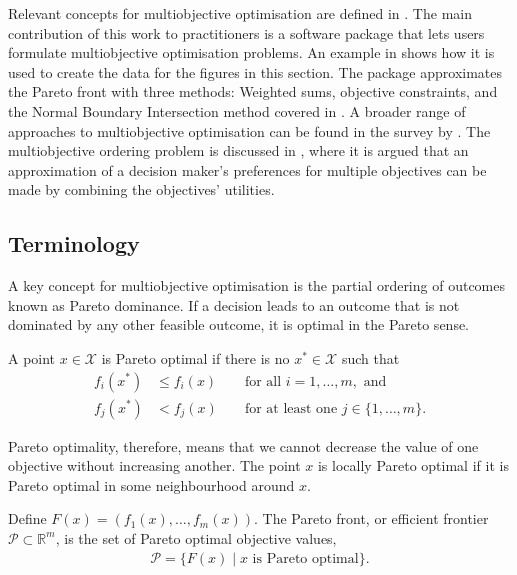 \documentclass[main.tex]{subfiles}
\begin{document}
Relevant concepts for multiobjective optimisation are defined in
.  The main contribution of this work to
practitioners is a software package that lets users formulate
multiobjective optimisation problems.  An example in
 shows how it is used to create the data for
the figures in this section.  The package approximates the Pareto
front with
three methods: Weighted sums, objective
constraints, and the Normal Boundary Intersection method covered in
.  A broader range of
approaches to multiobjective optimisation can be found in the survey
by \citet{marler2004survey}.  The multiobjective ordering problem is
discussed in , where it is argued that an
approximation of a decision maker's preferences for multiple
objectives can be made by combining the objectives' utilities.


\subsection{Terminology}\label{sec:multi_terminology}
A key concept for multiobjective optimisation is the partial
ordering of outcomes known as Pareto dominance. If a decision leads to
an outcome that is not dominated by any other feasible outcome, it is
optimal in the Pareto sense.
\begin{mydef}
  A point $x\in\mathcal{X}$ is Pareto optimal if there is no
  $x^*\in\mathcal{X}$ such that
  \begin{align}
    f_i(x^*)&\leq f_i(x) &&\text{ for all } i = 1,\dots,m, \text{ and}\\
    f_j(x^*)&<f_j(x) &&\text{ for at least one } j \in \{1,\dots,m\}.
  \end{align}
\end{mydef}
Pareto optimality, therefore, means that we cannot decrease the value of
one objective without increasing another.
The point $x$ is locally Pareto optimal if it is Pareto optimal in
some neighbourhood around $x$.
\begin{mydef}
  Define $F(x) = (f_1(x),\dots,f_m(x))$.
  The Pareto front, or efficient frontier $\mathcal{P}\subset
  \mathbb{R}^m$, is the set of
  Pareto optimal objective values,
  \begin{align}
    \mathcal{P} = \{F(x) \mid x \text{ is Pareto optimal}\}.
  \end{align}
\end{mydef}
\end{document}
